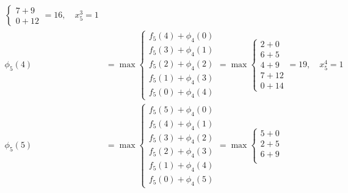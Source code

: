 \documentclass{article}
\begin{document}
\[\begin{aligned}
\begin{cases}
                                                  7 + 9 \\
                                                  0 + 12
                                              \end{cases} = 16, \quad x_5^3 = 1               \\
        \phi_5(4) & = \max \begin{cases}
                               f_5(4) + \phi_4(0) \\
                               f_5(3) + \phi_4(1) \\
                               f_5(2) + \phi_4(2) \\
                               f_5(1) + \phi_4(3) \\
                               f_5(0) + \phi_4(4)
                           \end{cases} = \max \begin{cases}
                                                  2 + 0  \\
                                                  6 + 5  \\
                                                  4 + 9  \\
                                                  7 + 12 \\
                                                  0 + 14
                                              \end{cases} = 19, \quad x_5^4 = 1               \\
        \phi_5(5) & = \max \begin{cases}
                               f_5(5) + \phi_4(0) \\
                               f_5(4) + \phi_4(1) \\
                               f_5(3) + \phi_4(2) \\
                               f_5(2) + \phi_4(3) \\
                               f_5(1) + \phi_4(4) \\
                               f_5(0) + \phi_4(5)
                           \end{cases} = \max \begin{cases}
                                                  5 + 0  \\
                                                  2 + 5  \\
                                                  6 + 9  \\

\end{cases}
\end{aligned}\]
\end{document}
